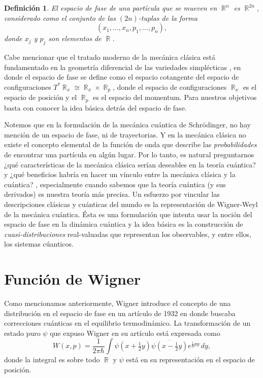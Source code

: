 \documentclass[a4paper]{report}
\DeclareMathOperator{\R}{\mathbb{R}}
\newtheorem{definition}{Definición}
\begin{document}
  \begin{definition}
    El espacio de fase de una partícula que se mueven en
    $\R^{n}$ es $\R^{2n}$, considerado como el conjunto de
    las $(2n)$-tuplas de la forma
    \[
      \left(
        x_1, \ldots, x_n, p_1, \ldots, p_n
      \right),
    \] 
    donde $x_j$ y $p_j$ son elementos de $\R$.
  \end{definition}

  Cabe mencionar que el tratado moderno de la mecánica
  clásica está fundamentado en la geometría diferencial de
  las variedades simplécticas
  \cite{mcinerneyFirstStepsDifferential2013}, en donde el
  espacio de fase se define como el espacio cotangente del
  espacio de configuraciones $T^{*} \R_x \cong \R_x \times
  \R_p$, donde el espacio de configuraciones  $\R_x$ es el
  espacio de posición y el $\R_p$ es el espacio del
  momentum.  Para nuestros objetivos basta con conocer la
  idea básica detrás del espacio de fase.

  Notemos que en la formulación de la mecánica cuántica de
  Schrödinger, no hay mención de un espacio de fase, ni de
  trayectorias. Y en la mecánica clásica no existe el
  concepto elemental de la función de onda que describe las
  \textit{probabilidades} de encontrar una partícula en
  algún lugar. Por lo tanto, es natural preguntarnos ¿qué
  características de la mecánica clásica serían deseables en
  la teoría cuántica? y ¿qué beneficios habría en hacer un
  vínculo entre la mecánica clásica y la cuántica?
  \cite{schroeckQuantumMechanicsPhase1996}, especialmente
  cuando sabemos que la teoría cuántica (y sus derivados) es
  nuestra teoría más precisa. Un esfuerzo por vincular las
  descripciones clásicas y cuánticas del mundo es la
  representación de Wigner-Weyl de la mecánica cuántica.
  Ésta es una formulación que intenta usar la noción del
  espacio de fase en la dinámica cuántica y la idea básica es
  la construcción de \textit{cuasi-distribuciones}
  real-valuadas que representan los observables, y entre
  ellos, los sistemas cúanticos.

  \section{Función de Wigner}

  Como mencionamos anteriormente, Wigner introduce el
  concepto de una distribución en el espacio de fase en un
  artículo de 1932
  \cite{wignerQuantumCorrectionThermodynamic1932} en donde
  buscaba correcciones cuánticas en el equilibrio
  termodinámico. La transformación de un estado puro $\psi$
  que expuso Wigner en su artículo está expresada como
  \begin{equation}
    \label{eqn:wigners_original}
    W(x,p)
    = \frac{1}{2\pi\hbar} \int
    \psi(x+\tfrac{1}{2}y)\overline{\psi(x-\tfrac{1}{2}y)}
    e^{\frac{i}{\hbar} p y} \, dy,
  \end{equation}
  donde la integral es sobre todo $\R$ y $\psi$ está en su
  representación en el espacio de posición.
\end{document}
